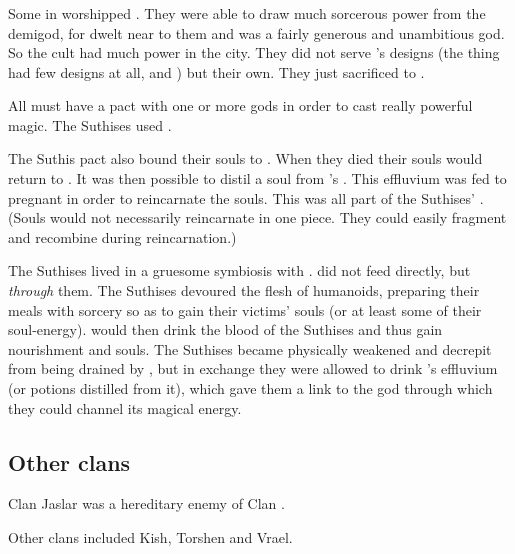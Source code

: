\subsubsection{\Ubloth}
Some \rethyaxes in \Yormis worshipped \Ubloth.
They were able to draw much sorcerous power from the demigod, for \Ubloth dwelt near to them and was a fairly generous and unambitious god. 
So the \Ubloth cult had much power in the city. 
They did not serve \Ubloth's designs (the thing had few designs at all, and ) but their own.
They just sacrificed to \Ubloth. 

All \rethyaxes must have a pact with one or more gods in order to cast really powerful magic. 
The Suthises used \Ubloth.

The Suthis pact also bound their souls to \Ubloth. 
When they died their souls would return to \Ubloth. 
It was then possible to distil a soul from \Ubloth's . 
This effluvium was fed to pregnant \sphyles in order to reincarnate the souls.
This was all part of the Suthises' .
(Souls would not necessarily reincarnate in one piece. 
 They could easily fragment and recombine during reincarnation.)

The Suthises lived in a gruesome symbiosis with \Ubloth.
\Ubloth did not feed directly, but \emph{through} them.
The Suthises devoured the flesh of humanoids, preparing their meals with sorcery so as to gain their victims' souls (or at least some of their soul-energy).
\Ubloth would then drink the blood of the Suthises and thus gain nourishment and souls.
The Suthises became physically weakened and decrepit from being drained by \Ubloth, but in exchange they were allowed to drink \Ubloth's effluvium (or potions distilled from it), which gave them a link to the god through which they could channel its magical energy. 









\subsection{Other clans}
Clan Jaslar was a hereditary enemy of Clan .

Other clans included Kish, Torshen and Vrael.























